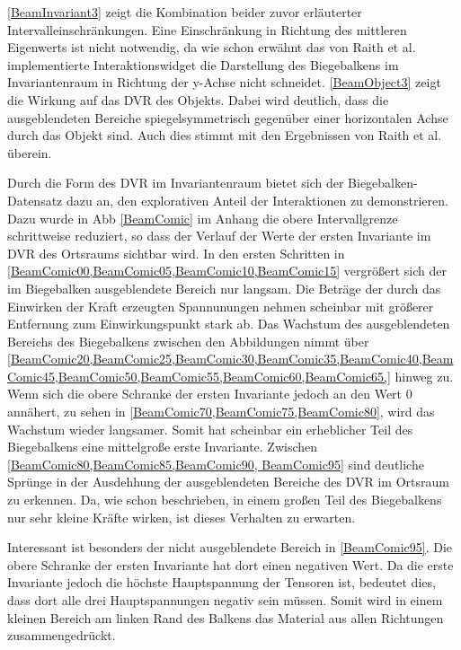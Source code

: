 \documentclass[a4paper,fontsize=12pt,toc=bib,halfparskip,ngerman]{scrartcl}
\begin{document}
\cref{BeamInvariant3} zeigt die Kombination beider zuvor erl\"auterter Intervalleinschr\"ankungen. Eine Einschr\"ankung in Richtung des mittleren Eigenwerts ist nicht notwendig, da wie schon erw\"ahnt das von Raith et al. implementierte Interaktionswidget die Darstellung des Biegebalkens im Invariantenraum in Richtung der y-Achse nicht schneidet. \cref{BeamObject3} zeigt die Wirkung auf das DVR des Objekts. Dabei wird deutlich, dass die ausgeblendeten Bereiche spiegelsymmetrisch gegen\"uber einer horizontalen Achse durch das Objekt sind. Auch dies stimmt mit den Ergebnissen von Raith et al. \"uberein.

Durch die Form des DVR im Invariantenraum bietet sich der Biegebalken-Datensatz dazu an, den explorativen Anteil der Interaktionen zu demonstrieren. Dazu wurde in Abb \cref{BeamComic} im Anhang die obere Intervallgrenze schrittweise reduziert, so dass der Verlauf der Werte der ersten Invariante im DVR des Ortsraums sichtbar wird. In den ersten Schritten in \cref{BeamComic00,BeamComic05,BeamComic10,BeamComic15} vergr\"o{\ss}ert sich der im Biegebalken ausgeblendete Bereich nur langsam. Die Betr\"age der durch das Einwirken der Kraft erzeugten Spannunungen nehmen scheinbar mit gr\"o{\ss}erer Entfernung zum Einwirkungspunkt stark ab. Das Wachstum des ausgeblendeten Bereichs des Biegebalkens zwischen den Abbildungen nimmt \"uber \cref{BeamComic20,BeamComic25,BeamComic30,BeamComic35,BeamComic40,BeamComic45,BeamComic50,BeamComic55,BeamComic60,BeamComic65,} hinweg zu. Wenn sich die obere Schranke der ersten Invariante jedoch an den Wert 0 ann\"ahert, zu sehen in \cref{BeamComic70,BeamComic75,BeamComic80}, wird das Wachstum wieder langsamer. Somit hat scheinbar ein erheblicher Teil des Biegebalkens eine mittelgro{\ss}e erste Invariante. Zwischen \cref{BeamComic80,BeamComic85,BeamComic90, BeamComic95} sind deutliche Spr\"unge in der Ausdehhung der ausgeblendeten Bereiche des DVR im Ortsraum zu erkennen. Da, wie schon beschrieben, in einem gro{\ss}en Teil des Biegebalkens nur sehr kleine Kr\"afte wirken, ist dieses Verhalten zu erwarten.

Interessant ist besonders der nicht ausgeblendete Bereich in \cref{BeamComic95}. Die obere Schranke der ersten Invariante hat dort einen negativen Wert. Da die erste Invariante jedoch die h\"ochste Hauptspannung der Tensoren ist, bedeutet dies, dass dort alle drei Hauptspannungen negativ sein m\"ussen. Somit wird in einem kleinen Bereich am linken Rand des Balkens das Material aus allen Richtungen zusammengedr\"uckt.
\end{document}
